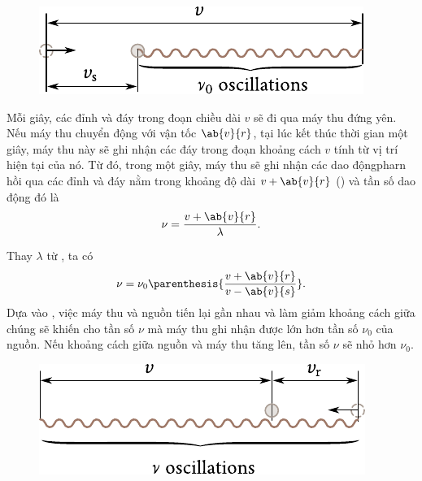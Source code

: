 \begin{figure}[!htb]
	\begin{center}
		\includegraphics[scale=1]{figures/ch_14/fig_14_15.pdf}
		\caption[]{}
		\label{fig:14_15}
	\end{center}
	\vspace{-0.8cm}
\end{figure}

Mỗi giây, các đỉnh và đáy trong đoạn chiều dài $v$ sẽ đi qua máy thu đứng yên.
Nếu máy thu chuyển động với vận tốc $\ab{v}{r}$, tại lúc kết thúc thời gian một giây, máy thu này sẽ ghi nhận các đáy trong đoạn khoảng cách $v$ tính từ vị trí hiện tại của nó.
Từ đó, trong một giây, máy thu sẽ ghi nhận các dao độngpharn hồi qua các đỉnh và đáy nằm trong khoảng độ dài $v+\ab{v}{r}$ () và tần số dao động đó là
\begin{equation*}
	\nu = \frac{v + \ab{v}{r}}{\lambda}.
\end{equation*}

\noindent
Thay $\lambda$ từ , ta có
\begin{equation}\label{eq:14_78}
	\nu = \nu_0 \parenthesis{\frac{v + \ab{v}{r}}{v - \ab{v}{s}}}.
\end{equation}
Dựa vào , việc máy thu và nguồn tiến lại gần nhau và làm giảm khoảng cách giữa chúng sẽ khiến cho tần số $\nu$ mà máy thu ghi nhận được lớn hơn tần số $\nu_0$ của nguồn.
Nếu khoảng cách giữa nguồn và máy thu tăng lên, tần số $\nu$ sẽ nhỏ hơn $\nu_0$.

\begin{figure}[!htb]
	\begin{center}
		\includegraphics[scale=1]{figures/ch_14/fig_14_16.pdf}
		\caption[]{}
		\label{fig:14_16}
	\end{center}
	\vspace{-0.8cm}
\end{figure}


